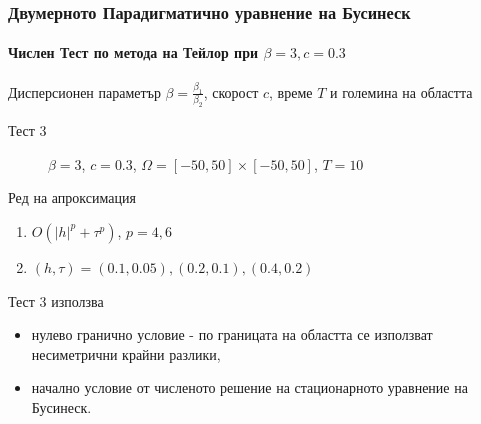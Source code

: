 \documentclass{beamer}
\begin{document}

\begin{frame}
\frametitle{Двумерното Парадигматично уравнение на Бусинеск}
\framesubtitle{Числен Тест по метода на Тейлор при $\beta = 3, c=0.3$}

Дисперсионен параметър $\beta= \frac{\beta_1}{\beta_2}$, скорост $c$, време $T$ и големина на областта
\begin{description}
 \item[Тест 3] $\beta = 3$, $c = 0.3$, $\Omega = [-50, 50] \times [-50, 50]$, $T = 10$
\end{description}

Ред на апроксимация
\begin{enumerate}
  \item $O(|h|^p + \tau^p)$, $p = 4, 6$
  \item $(h, \tau)=(0.1, 0.05), (0.2, 0.1), (0.4, 0.2)$
\end{enumerate}

Тест 3 използва 
\begin{itemize} 
\item нулево гранично условие - по границата на областта се използват несиметрични крайни разлики,
\item начално условие от численото решение на стационарното уравнение на Бусинеск.
\end{itemize}
\end{frame}
\end{document}
